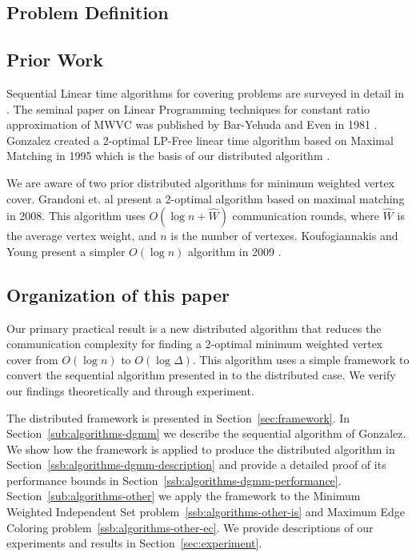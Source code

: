 \documentclass[conference, 10pt, letter]{IEEEtran}
\begin{document}
\subsection{Problem Definition}

\subsection{Prior Work}

Sequential Linear time algorithms for covering problems are surveyed in detail in \cite{254190}. The seminal paper on Linear Programming techniques for constant ratio approximation of MWVC was published by Bar-Yehuda and Even in 1981 \cite{Bar-Yehuda:1981lr}. Gonzalez created a 2-optimal LP-Free linear time algorithm based on Maximal Matching in 1995 which is the basis of our distributed algorithm \cite{Gonzalez1995129}. 

We are aware of two prior distributed algorithms for minimum weighted vertex cover. Grandoni et. al present a 2-optimal algorithm based on maximal matching in 2008\cite{1435381}. This algorithm uses $O(\log n + \hat{W})$ communication rounds, where $\hat{W}$ is the average vertex weight, and $n$ is the number of vertexes. Koufogiannakis and Young present a simpler $O(\log n)$ algorithm in 2009 \cite{1582746}.

\subsection{Organization of this paper}
Our primary practical result is a new distributed algorithm that reduces the communication complexity for finding a 2-optimal minimum weighted vertex cover from $O(\log n)$ to $O(\log \Delta)$. This algorithm uses a simple framework to convert the sequential algorithm presented in \cite{Gonzalez1995129} to the distributed case. We verify our findings theoretically and through experiment.

The distributed framework is presented in Section~\ref{sec:framework}. In Section~\ref{sub:algorithms-dgmm} we describe the sequential algorithm of Gonzalez. We show how the framework is applied to produce the distributed algorithm in Section~\ref{ssb:algorithms-dgmm-description} and provide a detailed proof of its performance bounds in Section~\ref{ssb:algorithms-dgmm-performance}. Section~\ref{sub:algorithms-other} we apply the framework to the Minimum Weighted Independent Set problem~\ref{ssb:algorithms-other-is} and Maximum Edge Coloring problem~\ref{ssb:algorithms-other-ec}. We provide descriptions of our experiments and results in Section~\ref{sec:experiment}. 
 
\end{document}
